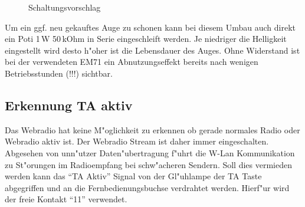\documentclass[ngerman,11pt,parskip=half] {scrartcl}
\begin{document}
\begin{figure}[H]
\centering
{}
\caption{Schaltungsvorschlag} \label{fig:1}
\end{figure}

Um ein ggf. neu gekauftes Auge zu schonen kann bei diesem Umbau auch direkt ein Poti 1\,W 50\,kOhm in Serie eingeschleift werden. Je niedriger die Helligkeit eingestellt wird desto h"oher ist die Lebensdauer des Auges. Ohne Widerstand ist bei der verwendeten EM71 ein Abnutzungseffekt bereits nach wenigen Betriebsstunden (!!!) sichtbar.

\subsection{Erkennung TA aktiv} \label{sec:mod:erkennungta}

Das Webradio hat keine M"oglichkeit zu erkennen ob gerade normales Radio oder Webradio aktiv ist. Der Webradio Stream ist daher immer eingeschalten. Abgesehen von unn"utzer Daten"ubertragung f"uhrt die W-Lan Kommunikation zu St"orungen im Radioempfang bei schw"acheren Sendern. Soll dies vermieden werden kann das "`TA Aktiv"' Signal von der Gl"uhlampe der TA Taste abgegriffen und an die Fernbedienungsbuchse verdrahtet werden. Hierf"ur wird der freie Kontakt "`11"' verwendet.
\end{document}
